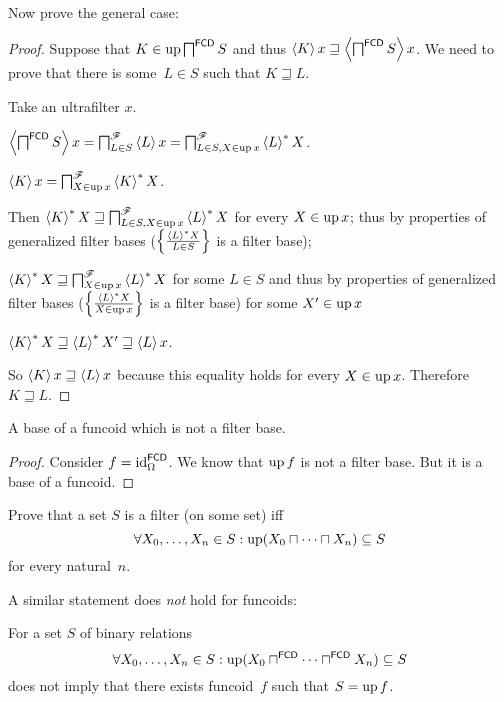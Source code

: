 Now prove the general case:

\begin{proof}
  Suppose that $K \in \operatorname{up} \bigsqcap^{\mathsf{FCD}} S$ and thus
  $\left\langle K\right\rangle x \sqsupseteq \left\langle 
  \bigsqcap^{\mathsf{FCD}} S \right\rangle x$.
  We need to prove that there is some~$L\in S$ such that $K\sqsupseteq L$.
  
  Take an ultrafilter $x$.
  
  $\left\langle \bigsqcap^{\mathsf{FCD}} S\right\rangle x =
  \bigsqcap^{\mathscr{F}}_{L \in S} \left\langle L\right\rangle x =
  \bigsqcap^{\mathscr{F}}_{L \in S, X \in \operatorname{up} x} \left\langle L\right\rangle ^{\ast} X$.
  
  $\left\langle K\right\rangle x = \bigsqcap^{\mathscr{F}}_{X \in \operatorname{up} x} \left\langle K\right\rangle ^{\ast}X$.
  
  Then
  $\left\langle K\right\rangle ^{\ast} X \sqsupseteq \bigsqcap^{\mathscr{F}}_{L \in S, X
  \in \operatorname{up} x} \left\langle L\right\rangle ^{\ast} X$ for every $X \in \operatorname{up} x$;
  thus by properties of generalized filter bases ($\left\{ \frac{ \left\langle L\right\rangle ^{\ast}X
  }{ L \in S }\right\}$ is a filter base);
  
  $\left\langle K\right\rangle ^{\ast} X \sqsupseteq \bigsqcap^{\mathscr{F}}_{X \in
  \operatorname{up} x} \left\langle L\right\rangle ^{\ast} X$ for some $L \in S$ and thus
  by properties of generalized filter bases ($\left\{ \frac{ \left\langle L\right\rangle ^{\ast}
  X }{ X \in \operatorname{up} x }\right\}$ is a filter base) for some $X' \in \operatorname{up} x$
  
  $\left\langle K\right\rangle ^{\ast} X \sqsupseteq \left\langle L\right\rangle ^{\ast} X'
  \sqsupseteq \left\langle L\right\rangle x$.
  
  So $\left\langle K\right\rangle x \sqsupseteq \left\langle L\right\rangle x$ because this
  equality holds for every $X \in \operatorname{up} x$. Therefore $K \sqsupseteq L$.
\end{proof}

\begin{example}
A base of a funcoid which is not a filter base.
\end{example}

\begin{proof}
Consider $f=\operatorname{id}^{\mathsf{FCD}}_{\Omega}$. We know that $\operatorname{up} f$ is not a
filter base. But it is a base of a funcoid.
\end{proof}

\begin{xca}
Prove that a set $S$ is a filter (on some set) iff
\[ \forall X_0,\dots,X_n\in S:\operatorname{up}(X_0\sqcap\dots\sqcap X_n)\subseteq S \]
for every natural~$n$.
\end{xca}

A similar statement does \emph{not} hold for funcoids:

\begin{example}
For a set $S$ of binary relations
\[ \forall X_0,\dots,X_n\in S:\operatorname{up}(X_0\sqcap^{\mathsf{FCD}}\dots\sqcap^{\mathsf{FCD}} X_n)\subseteq S \]
does not imply that there exists funcoid~$f$ such that $S=\operatorname{up} f$.
\end{example}

